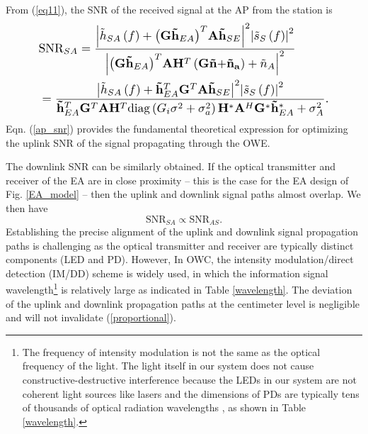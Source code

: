 \par
From (\ref{eq11}), the SNR of the received signal at the AP from the station is
\begin{equation}
\label{ap_snr}
\resizebox{.85\hsize}{!}{$
\begin{aligned}
& \text{SNR}_{SA} = \frac{{{{\left| {{{\tilde h}_{SA}}\left( f \right) + {{\left( {\mathbf{G}{{\mathbf{\tilde h}}_{EA}}} \right)}^T}\mathbf{A}{{\mathbf{\tilde h}}_{SE}}} \right|}^2}{{\left| {{{\tilde s}_{S}}\left( f \right)} \right|}^2}}}{{{{\left| {{{\left( {\mathbf{G}{{\mathbf{\tilde h}}_{EA}}} \right)}^T}\mathbf{A}{\mathbf{H}^T}\left( {\mathbf{G\tilde n + }{{\mathbf{\tilde n}}_\mathbf{a}}} \right) + {{\tilde n}_{A}}} \right|}^2}}} \\
&= \frac{{{{\left| {{{\tilde h}_{SA}}\left( f \right) + \mathbf{\tilde h}_{EA}^T{\mathbf{G}^T}\mathbf{A}{{\mathbf{\tilde h}}_{SE}}} \right|}^2}{{\left| {{{\tilde s}_{S}}\left( f \right)} \right|}^2}}}{{\mathbf{\tilde h}_{EA}^T{\mathbf{G}^T}\mathbf{A}{\mathbf{H}^T}{\mathop{\rm diag}\nolimits} \left( {{G_i}{\sigma ^2} + \sigma _a^2} \right){\mathbf{H}^*}{\mathbf{A}^H}{\mathbf{G}^*}\mathbf{\tilde h}_{EA}^* + \sigma _A^2}} \text{.}
\end{aligned}
$}
\end{equation}
Eqn. (\ref{ap_snr}) provides the fundamental theoretical expression for optimizing the uplink SNR of the signal propagating through the OWE. 
\par
The downlink SNR can be similarly obtained. If the optical transmitter and receiver of the EA are in close proximity -- this is the case for the EA design of Fig. \ref{EA_model} -- then the uplink and downlink signal paths almost overlap. We then have 
\begin{equation}
\label{proportional}
    \text{SNR}_{SA} \propto \text{SNR}_{AS} \text{.}
\end{equation}
Establishing the precise alignment of the uplink and downlink signal propagation paths is challenging as the optical transmitter and receiver are typically distinct components (LED and PD). However, In OWC, the intensity modulation/direct detection (IM/DD) scheme is widely used, in which the information signal wavelength\footnote{The frequency of intensity modulation is not the same as the optical frequency of the light. The light itself in our system does not cause constructive-destructive interference because the LEDs in our system are not coherent light sources like lasers and the dimensions of PDs are typically tens of thousands of optical radiation wavelengths \cite{ghassemlooy2019optical, 380210, wong2000performance, al2018optical}, as shown in Table \ref{wavelength}.} is relatively large as indicated in Table \ref{wavelength}. The deviation of the uplink and downlink propagation paths at the centimeter level is negligible and will not invalidate (\ref{proportional}).

